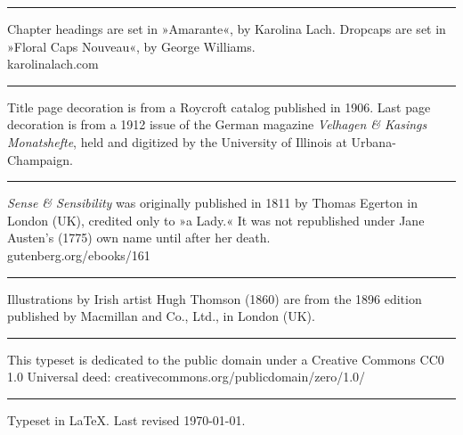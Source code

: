 \documentclass[
a5paper,
BCOR=7mm,
twoside,
DIV=calc,
11pt,
usegeometry,
chapterprefix,
headings=big,
numbers=noenddot,
listof=flat,
listof=nochaptergap]{scrbook}
\begin{document}
\rule{0.5\textwidth}{.4pt}

Chapter headings are set in »Amarante«, by Karolina Lach. Dropcaps are set in »Floral Caps Nouveau«, by George Williams. \\karolinalach.com

\rule{0.5\textwidth}{.4pt}

Title page decoration is from a Roycroft catalog published in 1906. Last page decoration is from a 1912 issue of the German magazine \textit{Velhagen \& Kasings Monatshefte}, held and digitized by the University of Illinois at Urbana-Champaign.

\rule{0.5\textwidth}{.4pt}

\textit{Sense \& Sensibility} was originally published in 1811 by Thomas Egerton in London (UK), credited only to »a Lady.« It was not republished under Jane Austen's (1775) own name until after her death.\\gutenberg.org/ebooks/161

\rule{0.5\textwidth}{.4pt}

Illustrations by Irish artist Hugh Thomson (1860) are from the 1896 edition published by Macmillan and Co., Ltd., in London (UK).

\rule{0.5\textwidth}{.4pt}

This typeset is dedicated to the public domain under a Creative Commons CC0 1.0 Universal deed: creativecommons.org/publicdomain/zero/1.0/\\

\rule{0.5\textwidth}{.4pt}

Typeset in \LaTeX{}. Last revised \today.
\thispagestyle{empty}
\end{document}
